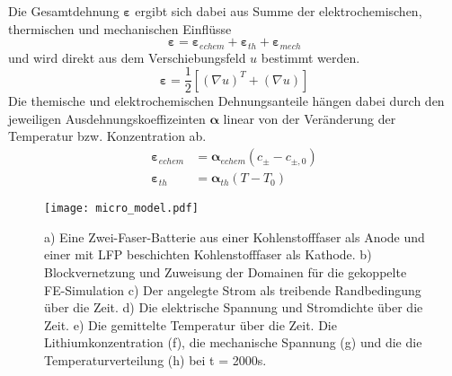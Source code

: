 Die Gesamtdehnung $\boldsymbol{\varepsilon}$ ergibt sich dabei aus Summe der elektrochemischen, thermischen und mechanischen Einflüsse
\begin{equation}
    \boldsymbol{\varepsilon} = \boldsymbol{\varepsilon}_{echem} +\boldsymbol{\varepsilon}_{th} + \boldsymbol{\varepsilon}_{mech}
\end{equation}
und wird direkt aus dem Verschiebungsfeld $u$ bestimmt werden.
\begin{equation}
    \boldsymbol{\varepsilon} = \frac{1}{2}\left[\left(\nabla u\right)^T + \left(\nabla u\right)\right]
\end{equation}
Die themische und elektrochemischen Dehnungsanteile hängen dabei durch den jeweiligen Ausdehnungskoeffizeinten $\boldsymbol{\alpha}$ linear von der Veränderung der Temperatur bzw. Konzentration ab.
\begin{align}
    \boldsymbol{\varepsilon}_{echem} &= \boldsymbol{\alpha}_{echem} \left(c_{\pm}-c_{\pm,0}\right)\\
    \boldsymbol{\varepsilon}_{th}  &= \boldsymbol{\alpha}_{th}\left( T - T_0\right)
\end{align}

\begin{figure}[!h]
        \center
		\texttt{[image: micro\_model.pdf]}
		\caption{\label{fig:micro_model}a) Eine Zwei-Faser-Batterie aus einer Kohlenstofffaser als Anode und einer mit LFP beschichten Kohlenstofffaser als Kathode. b) Blockvernetzung und Zuweisung der Domainen für die gekoppelte FE-Simulation c) Der angelegte Strom als treibende Randbedingung über die Zeit. d) Die elektrische Spannung und Stromdichte über die Zeit. e) Die gemittelte Temperatur über die Zeit. Die Lithiumkonzentration (f), die mechanische Spannung (g) und die die Temperaturverteilung (h) bei t = 2000s.}
\end{figure}


